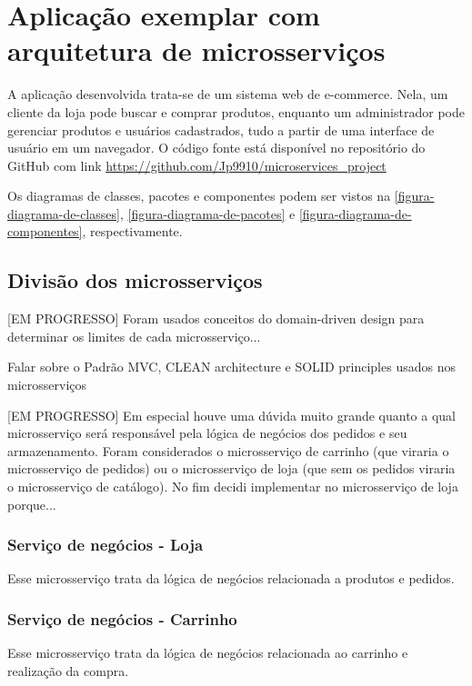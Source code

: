 \chapter{Aplicação exemplar com arquitetura de microsserviços}\label{chapter-aplicacao}



A aplicação desenvolvida trata-se de um sistema web de e-commerce. Nela, um cliente da loja pode buscar e comprar produtos, enquanto um administrador pode gerenciar produtos e usuários cadastrados, tudo a partir de uma interface de usuário em um navegador.
O código fonte está disponível no repositório do GitHub com link \url{https://github.com/Jp9910/microservices_project}

Os diagramas de classes, pacotes e componentes podem ser vistos na \autoref{figura-diagrama-de-classes}, \autoref{figura-diagrama-de-pacotes} e \autoref{figura-diagrama-de-componentes}, respectivamente.

\section{Divisão dos microsserviços}

[EM PROGRESSO] Foram usados conceitos do domain-driven design para determinar os limites de cada microsserviço...

Falar sobre o Padrão MVC, CLEAN architecture e SOLID principles usados nos microsserviços

[EM PROGRESSO] Em especial houve uma dúvida muito grande quanto a qual microsserviço será responsável pela lógica de negócios dos pedidos e seu armazenamento. Foram considerados o microsserviço de carrinho (que viraria o microsserviço de pedidos) ou o microsserviço de loja (que sem os pedidos viraria o microsserviço de catálogo). No fim decidi implementar no microsserviço de loja porque...

\subsection*{Serviço de negócios - Loja}
Esse microsserviço trata da lógica de negócios relacionada a produtos e pedidos.

\subsection*{Serviço de negócios - Carrinho}
Esse microsserviço trata da lógica de negócios relacionada ao carrinho e realização da compra.

